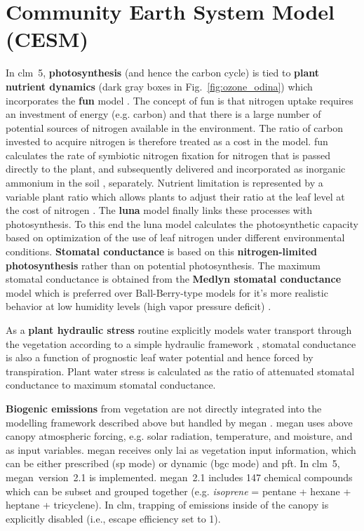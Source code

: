 \section{Community Earth System Model (CESM)}
\label{sec:cesm}
In \gls{clm}~5, \textbf{photosynthesis} (and hence the {\color{darkgray}carbon cycle}) is tied to \textbf{\color{darkgray}plant nutrient dynamics} (dark gray boxes in Fig.~\ref{fig:ozone_odina}) which incorporates the \textbf{\gls{fun}} model \parencites{GBC:Fisher2010}{JGR:Brzostek2014}{GCB:Shi2015}. The concept of \gls{fun} is that nitrogen uptake requires an investment of energy (e.g. carbon) and that there is a large number of potential sources of nitrogen available in the environment. The ratio of carbon invested to acquire nitrogen is therefore treated as a cost in the model. \gls{fun} calculates the rate of symbiotic nitrogen fixation for nitrogen that is passed directly to the plant, and subsequently delivered and incorporated  as inorganic ammonium in the soil \parencite{GBC:Cleveland1999}, separately. Nutrient limitation is represented by a variable plant  ratio which allows plants to adjust their  ratio at the leaf level at the cost of nitrogen \parencite{JAMES:Ghimire2016}. The \textbf{\gls{luna}} model \parencites{STE:Xu2019}{GMD:Ali2016} finally links these processes with photosynthesis. To this end the \gls{luna} model calculates the photosynthetic capacity based on optimization of the use of leaf nitrogen under different environmental conditions. \textbf{Stomatal conductance} is based on this \textbf{nitrogen-limited photosynthesis} rather than on potential photosynthesis. The maximum stomatal conductance is obtained from the \textbf{Medlyn stomatal conductance} model \parencite{GCB:Medlyn2011} which is preferred over Ball-Berry-type models \parencite{BallBerry1987} for it’s more realistic behavior at low humidity levels (high vapor pressure deficit) \parencites{PR:Rogers2013}{NP:Rogers2017}.

As a \textbf{plant hydraulic stress} routine explicitly models water transport through the vegetation according to a simple hydraulic framework \parencite{JAMES:Kennedy2019}, stomatal conductance is also a function of prognostic leaf water potential and hence forced by transpiration. Plant water stress is calculated as the ratio of attenuated stomatal conductance to maximum stomatal conductance.

\textbf{Biogenic emissions} from vegetation are not directly integrated into the modelling framework described above but handled by \gls{megan} \parencite{ACP:Guenther2006}. \gls{megan} uses above canopy atmospheric forcing, e.g. solar radiation, temperature, and moisture, and \ch{[CO_2]} as input variables. \gls{megan} receives only \gls{lai} as vegetation input information, which can be either prescribed (\gls{sp} mode) or dynamic (\gls{bgc} mode) and \gls{pft}. In \gls{clm}~5, \gls{megan}~version~2.1 \parencite{GMD:Guenther2012} is implemented. \gls{megan}~2.1 includes 147 chemical compounds which can be subset and grouped together (e.g. \emph{isoprene} = pentane + hexane + heptane + tricyclene). In \gls{clm}, trapping of emissions inside of the canopy is explicitly disabled (i.e., escape efficiency set to 1).

